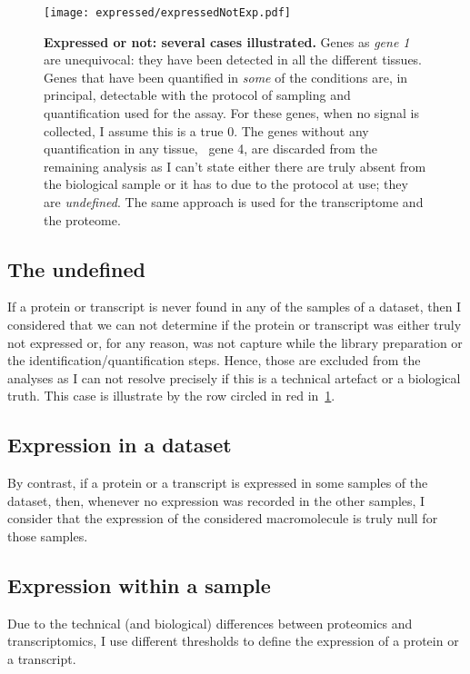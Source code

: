\begin{figure}[!htbp]
    \texttt{[image: expressed/expressedNotExp.pdf]}\centering
      \caption[Expressed or not: several cases illustrated]
      {\label{fig:DefineExpression}\textbf{Expressed or not: several cases
      illustrated.}\smallbreak{} Genes as \emph{gene 1} are unequivocal: they have been
      detected in all the different tissues. Genes that have been quantified in
      \emph{some} of the conditions are, in principal, detectable with the
      protocol of sampling and quantification used for the assay.
      For these genes, when no signal is collected, I assume this is a true $0$.
      The genes without any quantification
      in any tissue, \eg\ gene 4, are discarded from the remaining analysis as
      I can't state
      either there are truly absent from the biological sample or it has to due
      to the protocol at use; they are \emph{undefined}. The same approach is used
      for the transcriptome and the proteome.}
\end{figure}

\subsection{The undefined}%
\label{subsec:ExpressedOrNot-undefined}
If a protein or transcript is never found in any of the samples of a dataset,
then I considered that we can not determine if the protein or transcript was
either truly not expressed or, for any reason, was not capture while the library
preparation or the identification/quantification steps. Hence, those are
excluded from the analyses as I can not resolve precisely if this is a
technical artefact or a biological truth. This case is illustrate by the row
circled in red in~\cref{fig:DefineExpression}.

\subsection{Expression in a dataset}
\label{subsec:ExpressedOrNot--expDataset}
By contrast, if a protein or a transcript is expressed in some samples of the
dataset, then, whenever no expression was recorded in the other
samples, I consider that the expression of the considered macromolecule is truly
null for those samples.

\subsection{Expression within a sample}
Due to the technical (and biological) differences between proteomics and
transcriptomics, I use different thresholds to define the expression of a protein
or a transcript.

